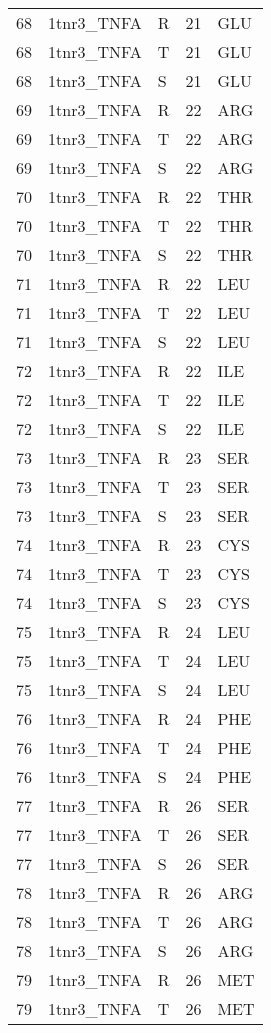 \begin{tiny}
\begin{longtable}[l]{l|l|l|l|l}
	68 & 1tnr3\_TNFA & R & 21 & GLU \\
	68 & 1tnr3\_TNFA & T & 21 & GLU \\
	68 & 1tnr3\_TNFA & S & 21 & GLU \\
	69 & 1tnr3\_TNFA & R & 22 & ARG \\
	69 & 1tnr3\_TNFA & T & 22 & ARG \\
	69 & 1tnr3\_TNFA & S & 22 & ARG \\
	70 & 1tnr3\_TNFA & R & 22 & THR \\
	70 & 1tnr3\_TNFA & T & 22 & THR \\
	70 & 1tnr3\_TNFA & S & 22 & THR \\
	71 & 1tnr3\_TNFA & R & 22 & LEU \\
	71 & 1tnr3\_TNFA & T & 22 & LEU \\
	71 & 1tnr3\_TNFA & S & 22 & LEU \\
	72 & 1tnr3\_TNFA & R & 22 & ILE \\
	72 & 1tnr3\_TNFA & T & 22 & ILE \\
	72 & 1tnr3\_TNFA & S & 22 & ILE \\
	73 & 1tnr3\_TNFA & R & 23 & SER \\
	73 & 1tnr3\_TNFA & T & 23 & SER \\
	73 & 1tnr3\_TNFA & S & 23 & SER \\
	74 & 1tnr3\_TNFA & R & 23 & CYS \\
	74 & 1tnr3\_TNFA & T & 23 & CYS \\
	74 & 1tnr3\_TNFA & S & 23 & CYS \\
	75 & 1tnr3\_TNFA & R & 24 & LEU \\
	75 & 1tnr3\_TNFA & T & 24 & LEU \\
	75 & 1tnr3\_TNFA & S & 24 & LEU \\
	76 & 1tnr3\_TNFA & R & 24 & PHE \\
	76 & 1tnr3\_TNFA & T & 24 & PHE \\
	76 & 1tnr3\_TNFA & S & 24 & PHE \\
	77 & 1tnr3\_TNFA & R & 26 & SER \\
	77 & 1tnr3\_TNFA & T & 26 & SER \\
	77 & 1tnr3\_TNFA & S & 26 & SER \\
	78 & 1tnr3\_TNFA & R & 26 & ARG \\
	78 & 1tnr3\_TNFA & T & 26 & ARG \\
	78 & 1tnr3\_TNFA & S & 26 & ARG \\
	79 & 1tnr3\_TNFA & R & 26 & MET \\
	79 & 1tnr3\_TNFA & T & 26 & MET \\

\end{longtable}
\end{tiny}
